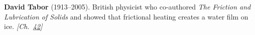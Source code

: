 \textbf{David Tabor} (1913–2005). British physicist who co-authored \emph{The Friction and Lubrication of Solids} and showed that frictional heating creates a water film on ice. \emph{[Ch.~\hyperref[ch:iceslipperiness]{42}]}

